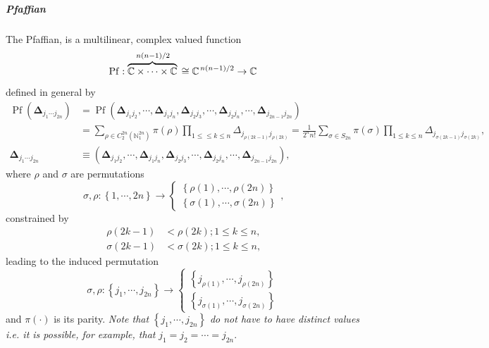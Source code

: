 \documentclass[aps, preprint]{revtex4}
\begin{document}
\subparagraph{Pfaffian}
The Pfaffian, is a multilinear, complex valued function
\begin{equation}\ensuremath{\operatorname*{Pf}} :\overset{\left .n \left (n -1\right )\right /2}{\overbrace{\mathbb{C} \times \cdots  \times \mathbb{C}}}\, \cong \mathbb{C}^{\left .n \left (n -1\right )\right /2} \rightarrow \mathbb{C}
\end{equation}defined in general by
\begin{align}\ensuremath{\operatorname*{Pf}} \left (\mathbf{\Delta }_{j_{1} \cdots  j_{2 n}}\right ) &  =\ensuremath{\operatorname*{Pf}} \left (\mathbf{\Delta }_{j_{1} j_{2}} ,\cdots  ,\mathbf{\Delta }_{j_{1} j_{n}} ,\mathbf{\Delta }_{j_{2} j_{3}} ,\cdots  ,\mathbf{\Delta }_{j_{2} j_{n}} ,\cdots  ,\mathbf{\Delta }_{j_{2 n -1} j_{2 n}}\right ) \\
 &  ={\displaystyle\sum _{\rho  \in C_{2}^{2 n} \left (\mathbb{N}_{1}^{2 n}\right )}}\pi  \left (\rho \right ) {\displaystyle\prod _{1 \leq  \leq k \leq n}} \Delta _{j_{\rho  \left (2 k -1\right )} j_{\rho  \left (2 k\right )}} = \frac{1}{2^{n} n !} {\displaystyle\sum _{\sigma  \in S_{2 n}}}\pi  \left (\sigma \right ) {\displaystyle\prod _{1 \leq k \leq n}} \Delta _{j_{\sigma  \left (2 k -1\right )} j_{\sigma  \left (2 k\right )}}\text{,} \\
\mathbf{\Delta }_{j_{1} \cdots  j_{2 n}} &  \equiv \left (\mathbf{\Delta }_{j_{1} j_{2}} ,\cdots  ,\mathbf{\Delta }_{j_{1} j_{n}} ,\mathbf{\Delta }_{j_{2} j_{3}} ,\cdots  ,\mathbf{\Delta }_{j_{2} j_{n}} ,\cdots  ,\mathbf{\Delta }_{j_{2 n -1} j_{2 n}}\right )\text{,}\end{align}where $\rho $ and $\sigma $ are permutations
\begin{equation}\sigma  ,\rho  :\left \{1 ,\cdots  ,2 n\right \} \longrightarrow \left \{\begin{array}{c}\left \{\rho  \left (1\right ) ,\cdots  ,\rho  \left (2 n\right )\right \} \\
\left \{\sigma  \left (1\right ) ,\cdots  ,\sigma  \left (2 n\right )\right \}\end{array}\right .\text{,}
\end{equation}constrained by
\begin{align}\rho  \left (2 k -1\right ) &  <\rho  \left (2 k\right ) ;1 \leq k \leq n\text{,} \\
\sigma  \left (2 k -1\right ) &  <\sigma  \left (2 k\right ) ;1 \leq k \leq n\text{,}\end{align}leading to the induced permutation
\begin{equation}\sigma  ,\rho  :\left \{j_{1} ,\cdots  ,j_{2 n}\right \} \longrightarrow \left \{\begin{array}{c}\left \{j_{\rho  \left (1\right )} ,\cdots  ,j_{\rho  \left (2 n\right )}\right \} \\
\left \{j_{\sigma  \left (1\right )} ,\cdots  ,j_{\sigma  \left (2 n\right )}\right \}\end{array}\right .
\end{equation}and $\pi  ( \cdot )$ is its parity. \emph{Note that }$\left \{j_{1} ,\cdots  ,j_{2 n}\right \}$ \emph{do not have to have distinct values i.e. it is possible, for example, that }$j_{1} =j_{2} =\cdots  =j_{2 n}$. 
\end{document}
